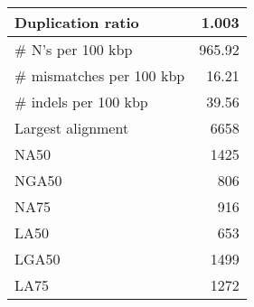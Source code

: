 \documentclass[12pt,a4paper]{article}
\begin{document}
\begin{table}[ht]
\begin{center}
\begin{tabular}{|l*{1}{|r}|}
Duplication ratio & 1.003 \\ \hline
\# N's per 100 kbp & 965.92 \\ \hline
\# mismatches per 100 kbp & 16.21 \\ \hline
\# indels per 100 kbp & 39.56 \\ \hline
Largest alignment & 6658 \\ \hline
NA50 & 1425 \\ \hline
NGA50 & 806 \\ \hline
NA75 & 916 \\ \hline
LA50 & 653 \\ \hline
LGA50 & 1499 \\ \hline
LA75 & 1272 \\ \hline
\end{tabular}
\end{center}
\end{table}
\end{document}

